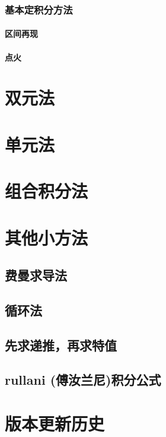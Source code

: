 \documentclass[lang=cn,newtx,10pt,scheme=chinese]{elegantbook}
\begin{document}
    \subsection{基本定积分方法}
    \subsubsection{区间再现}
    \subsubsection{点火}

\chapter{双元法}
\chapter{单元法}
\chapter{组合积分法}
\chapter{其他小方法}
\section{费曼求导法}
\section{循环法}
\section{先求递推，再求特值}
\section{rullani (傅汝兰尼)积分公式}

\appendix
\chapter{版本更新历史}
\end{document}
